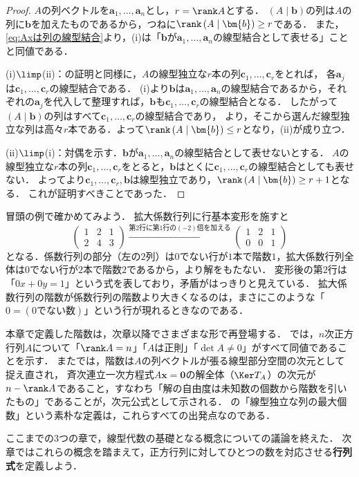 \begin{tleftbar}
\begin{proof}
  $A$の列ベクトルを$\bm{a}_1, \dots, \bm{a}_n$とし，$r = \rank A$とする．
  $(A \mid \bm{b})$の列は$A$の列に$\bm{b}$を加えたものであるから，つねに$\rank\, (A \mid \bm{b}) \ge r$である．
  また，\eqref{eq:Axは列の線型結合}より，(i)は「$\bm{b}$が$\bm{a}_1, \dots, \bm{a}_n$の線型結合として表せる」ことと同値である．

  (i)$\limp$(ii)：の証明と同様に，$A$の線型独立な$r$本の列$\bm{c}_1, \dots, \bm{c}_r$をとれば，
  各$\bm{a}_j$は$\bm{c}_1, \dots, \bm{c}_r$の線型結合である．
  (i)より$\bm{b}$は$\bm{a}_1, \dots, \bm{a}_n$の線型結合であるから，それぞれの$\bm{a}_j$を代入して整理すれば，$\bm{b}$も$\bm{c}_1, \dots, \bm{c}_r$の線型結合となる．
  したがって$(A \mid \bm{b})$の列はすべて$\bm{c}_1, \dots, \bm{c}_r$の線型結合であり，
  より，そこから選んだ線型独立な列は高々$r$本である．よって$\rank\, (A \mid \bm{b}) \le r$となり，(ii)が成り立つ．

  (ii)$\limp$(i)：対偶を示す．$\bm{b}$が$\bm{a}_1, \dots, \bm{a}_n$の線型結合として表せないとする．
  $A$の線型独立な$r$本の列$\bm{c}_1, \dots, \bm{c}_r$をとると，$\bm{b}$はとくに$\bm{c}_1, \dots, \bm{c}_r$の線型結合としても表せない．
  よってより$\bm{c}_1, \dots, \bm{c}_r, \bm{b}$は線型独立であり，$\rank\, (A \mid \bm{b}) \ge r + 1$となる．
  これが証明すべきことであった．
\end{proof}
\end{tleftbar}

冒頭の例で確かめてみよう．
拡大係数行列に行基本変形を施すと
\[
  \begin{pmatrix} 1 & 2 & 1 \\ 2 & 4 & 3 \end{pmatrix}
  \xrightarrow{\text{第$2$行に第$1$行の$(-2)$倍を加える}}
  \begin{pmatrix} 1 & 2 & 1 \\ 0 & 0 & 1 \end{pmatrix}
\]
となる．係数行列の部分（左の$2$列）は$0$でない行が$1$本で階数$1$，拡大係数行列全体は$0$でない行が$2$本で階数$2$であるから，より解をもたない．
変形後の第$2$行は「$0x + 0y = 1$」という式を表しており，矛盾がはっきりと見えている．
拡大係数行列の階数が係数行列の階数より大きくなるのは，まさにこのような「$0 = (\text{$0$でない数})$」という行が現れるときなのである．

\begin{mycolumn}
  本章で定義した階数は，次章以降でさまざまな形で再登場する．
  では，$n$次正方行列$A$について「$\rank A = n$」「$A$は正則」「$\det A \ne 0$」がすべて同値であることを示す．
  またでは，階数は$A$の列ベクトルが張る線型部分空間の次元として捉え直され，
  斉次連立一次方程式$A\bm{x} = \bm{0}$の解全体（$\Ker T_A$）の次元が$n - \rank A$であること，すなわち「解の自由度は未知数の個数から階数を引いたもの」であることが，次元公式として示される．
  の「線型独立な列の最大個数」という素朴な定義は，これらすべての出発点なのである．
\end{mycolumn}

ここまでの$3$つの章で，線型代数の基礎となる概念についての議論を終えた．
次章ではこれらの概念を踏まえて，正方行列に対してひとつの数を対応させる\textbf{行列式}を定義しよう．
